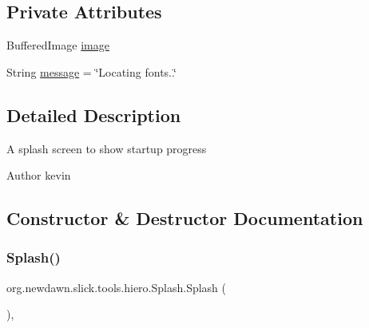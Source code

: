\subsection*{Private Attributes}
\begin{DoxyCompactItemize}
\item 
Buffered\+Image \mbox{\hyperlink{classorg_1_1newdawn_1_1slick_1_1tools_1_1hiero_1_1_splash_aa7f9bf57a1205b3ed105ae9392f17cff}{image}}
\item 
String \mbox{\hyperlink{classorg_1_1newdawn_1_1slick_1_1tools_1_1hiero_1_1_splash_a9e7ce871c3624f5153d712d0e38e9312}{message}} = \char`\"{}Locating fonts..\char`\"{}
\end{DoxyCompactItemize}


\subsection{Detailed Description}
A splash screen to show startup progress

\begin{DoxyAuthor}{Author}
kevin 
\end{DoxyAuthor}


\subsection{Constructor \& Destructor Documentation}
\mbox{\label{classorg_1_1newdawn_1_1slick_1_1tools_1_1hiero_1_1_splash_abb0d061c651647e61beaacc7a84c69b4}} 
\subsubsection{\texorpdfstring{Splash()}{Splash()}}
{\footnotesize\ttfamily org.\+newdawn.\+slick.\+tools.\+hiero.\+Splash.\+Splash (\begin{DoxyParamCaption}{ }\end{DoxyParamCaption})\hspace{0.3cm}{\ttfamily [inline]}, {\ttfamily [package]}}

